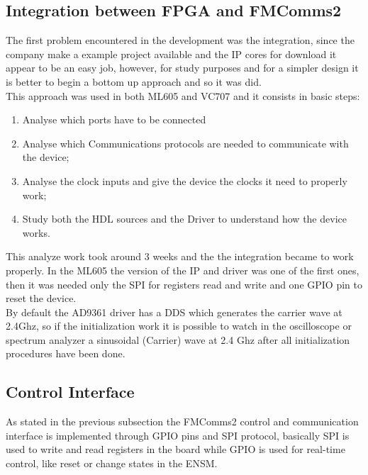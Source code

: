 \subsection{Integration between FPGA and FMComms2}

The first problem encountered in the development was the integration, since the
company make a example project available and the IP cores for download it appear
to be an easy job, however, for study purposes and for a simpler design it is
better to begin a bottom up approach and so it was did.\\

This approach was used in both ML605 and VC707 and it consists in basic steps:

\begin{enumerate}
    \item Analyse which ports have to be connected
    \item Analyse which Communications protocols are needed to communicate with the device;
    \item Analyse the clock inputs and give the device the clocks it need to properly work;
    \item Study both the HDL sources and the Driver to understand how the device works.
\end{enumerate}

This analyze work took around 3 weeks and the the integration became to work
properly. In the ML605 the version of the IP and driver was one of the first
ones, then it was needed only the SPI for registers read and write and one
GPIO pin to reset the device.\\

By default the AD9361 driver has a DDS which generates the carrier wave at 2.4Ghz,
so if the initialization work it is possible to watch in the oscilloscope or
spectrum analyzer a sinusoidal (Carrier) wave at 2.4 Ghz after all initialization
procedures have been done.

\subsection{Control Interface}
\label{subs:controlif}

As stated in the previous subsection the FMComms2 control and communication
interface is implemented through GPIO pins and SPI protocol, basically SPI is
used to write and read registers in the board while GPIO is used for real-time
control, like reset or change states in the ENSM.\\

